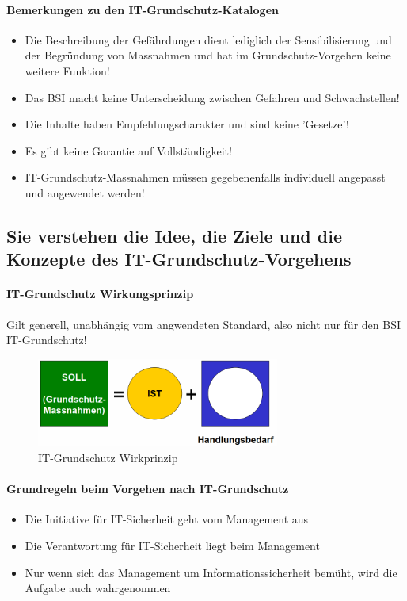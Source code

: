 \documentclass[10pt,a4paper]{article}
\begin{document}
\paragraph*{Bemerkungen zu den IT-Grundschutz-Katalogen}
\begin{itemize}[noitemsep,topsep=0pt,leftmargin=*]
    \item Die Beschreibung der Gefährdungen dient lediglich der Sensibilisierung und der Begründung von Massnahmen und hat im Grundschutz-Vorgehen keine weitere Funktion!
    \item Das BSI macht keine Unterscheidung zwischen Gefahren und Schwachstellen!
    \item Die Inhalte haben Empfehlungscharakter und sind keine 'Gesetze'!
    \item Es gibt keine Garantie auf Vollständigkeit!
    \item IT-Grundschutz-Massnahmen müssen gegebenenfalls individuell angepasst und angewendet werden!
\end{itemize}

\subsection*{Sie verstehen die Idee, die Ziele und die Konzepte des IT-Grundschutz-Vorgehens}

\paragraph*{IT-Grundschutz Wirkungsprinzip} Gilt generell, unabhängig vom angwendeten Standard, also nicht nur für den BSI IT-Grundschutz!
\begin{figure}[H]
    \begin{center}
    \includegraphics[width=8cm]{images/Grundschutz_Wirkprinzip.png}
    \caption{IT-Grundschutz Wirkprinzip}
    \label{IT-Grundschutz Wirkprinzip}
    \end{center}
\end{figure}

\paragraph*{Grundregeln beim Vorgehen nach IT-Grundschutz}
\begin{itemize}[noitemsep,topsep=0pt,leftmargin=*]
    \item Die Initiative für IT-Sicherheit geht vom Management aus
    \item Die Verantwortung für IT-Sicherheit liegt beim Management
    \item Nur wenn sich das Management um Informationssicherheit bemüht, wird die Aufgabe auch wahrgenommen
\end{itemize}
\end{document}
